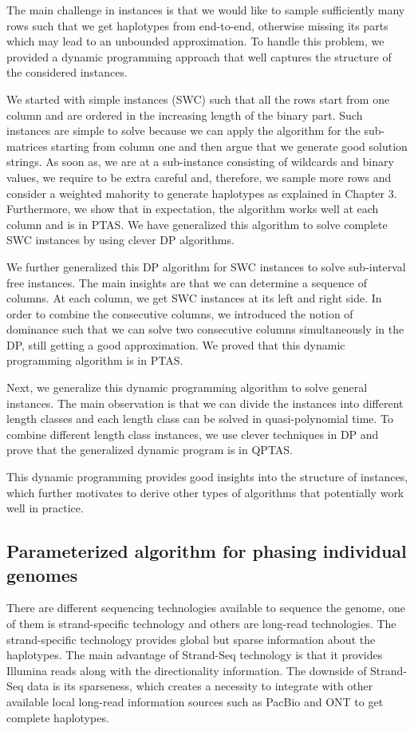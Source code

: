 The main challenge in \GMEC instances is that we would like to sample sufficiently many rows such that we get haplotypes from end-to-end, otherwise missing its parts which may lead to an unbounded approximation.
To handle this problem, we provided a dynamic programming approach that well captures the structure of the considered instances.

We started with simple instances (SWC) such that all the rows start from one column and are ordered in the increasing length of the binary part.
Such instances are simple to solve because we can apply the \BMEC algorithm for the sub-matrices starting from column one and then argue that we generate good solution strings.
As soon as, we are at a sub-instance consisting of wildcards and binary values, we require to be extra careful and, therefore, we sample more rows and consider a weighted mahority to generate haplotypes as explained in Chapter 3.
Furthermore, we show that in expectation, the algorithm works well at each column and is in PTAS. 
We have generalized this algorithm to solve complete SWC instances by using clever DP algorithms.

We further generalized this DP algorithm for SWC instances to solve sub-interval free instances. 
The main insights are that we can determine a sequence of columns. At each column, we get SWC instances at its left and right side.
In order to combine the consecutive columns, we introduced the notion of dominance such that we can solve two consecutive columns simultaneously in the DP, still getting a good approximation.
We proved that this dynamic programming algorithm is in PTAS.

Next, we generalize this dynamic programming algorithm to solve general \GMEC instances. 
The main observation is that we can divide the instances into different length classes and each length class can be solved in quasi-polynomial time.
To combine different length class instances, we use clever techniques in DP and prove that the generalized dynamic program is in QPTAS.

This dynamic programming provides good insights into the structure of instances, which further motivates to derive other types of algorithms that potentially work well in practice.

\subsection{Parameterized algorithm for phasing individual genomes}
There are different sequencing technologies available to sequence the genome, one of them is strand-specific technology and others are long-read technologies.
The strand-specific technology provides global but sparse information about the haplotypes. The main advantage of Strand-Seq technology is that it provides Illumina reads along with the directionality information.
The downside of Strand-Seq data is its sparseness, which creates a necessity to integrate with other available local long-read information sources such as PacBio and ONT to get complete haplotypes.


